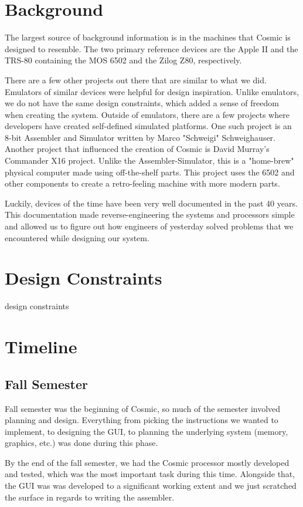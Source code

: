 \documentclass[conference]{IEEEtran}
\begin{document}
\section{Background}
The largest source of background information is in the machines that Cosmic is designed to resemble. The two primary reference devices are the Apple II and the TRS-80 containing the MOS 6502 and the Zilog Z80, respectively.

There are a few other projects out there that are similar to what we did. Emulators of similar devices were helpful for design inspiration. Unlike emulators, we do not have the same design constraints, which added a sense of freedom when creating the system. Outside of emulators, there are a few projects where developers have created self-defined simulated platforms. One such project is an 8-bit Assembler and Simulator written by Marco "Schweigi" Schweighauser\cite{b1}. Another project that influenced the creation of Cosmic is David Murray's Commander X16 project\cite{b2}. Unlike the Assembler-Simulator, this is a "home-brew" physical computer made using off-the-shelf parts. This project uses the 6502 and other components to create a retro-feeling machine with more modern parts. 

Luckily, devices of the time have been very well documented in the past 40 years. This documentation made reverse-engineering the systems and processors simple and allowed us to figure out how engineers of yesterday solved problems that we encountered while designing our system. 


\section{Design Constraints}
design constraints


\section{Timeline}

\subsection{Fall Semester}
Fall semester was the beginning of Cosmic, so much of the semester involved planning and design. Everything from picking the instructions we wanted to implement, to designing the GUI, to planning the underlying system (memory, graphics, etc.) was done during this phase.

By the end of the fall semester, we had the Cosmic processor mostly developed and tested, which was the most important task during this time. Alongside that, the GUI was was developed to a significant working extent and we just scratched the surface in regards to writing the assembler.
\end{document}
